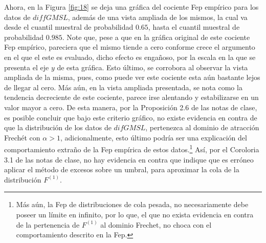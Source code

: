 \documentclass[10.5pt,notitlepage]{article}
\theoremstyle{plain}
\begin{document}
Ahora, en la Figura \ref{fig:18} se deja una gráfica del cociente Fep empírico para los datos de \(diffGMSL\), además de una vista ampliada de los mismos, la cual va desde el cuantil muestral de probabilidad \(0.65\), hasta el cuantil muestral de probabilidad \(0.985\). Note que, pese a que en la gráfica original de este cociente Fep empírico, pareciera que el mismo tiende a cero conforme crece el argumento en el que el este es evaluado, dicho efecto es engañoso, por la escala en la que se presenta el eje \(y\) de esta gráfica. Esto último, se corrobora al observar la vista ampliada de la misma, pues, como puede ver este cociente esta aún bastante lejos de llegar al cero. Más aún, en la vista ampliada presentada, se nota como la tendencia decreciente de este cociente, parece irse alentando y estabilizarse en un valor mayor a cero. De esta manera, por la Proposición 2.6 de las notas de clase, es posible concluir que bajo este criterio gráfico, no existe evidencia en contra de que la distribución de los datos de \(difGMSL\), pertenezca al dominio de atracción Frechét con \(\alpha >1\), adicionalmente, esto último podría ser una explicación del comportamiento extraño de la Fep empírica de estos datos.\footnote{Más aún, la Fep de distribuciones de cola pesada, no necesariamente debe poseer un límite en infinito, por lo que, el que no exista evidencia en contra de la pertenencia de \(F^{(1)}\) al dominio Frechet, no choca con el comportamiento descrito en la Fep.} Así, por el Coroloria 3.1 de las notas de clase, no hay evidencia en contra que indique que es erróneo aplicar el método de excesos sobre un umbral, para aproximar la cola de la distribución \(F^{(1)}\). 
\end{document}
